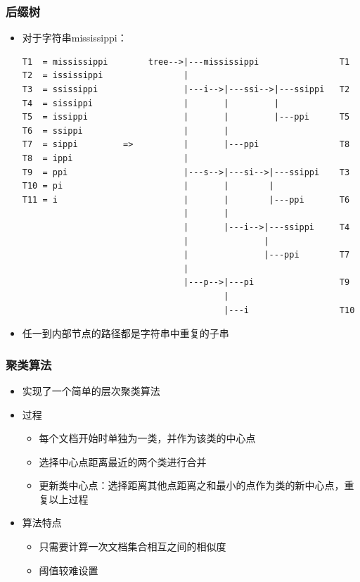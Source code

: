 \documentclass[11pt,presentation]{beamer}
\begin{document}
\begin{frame}[fragile]
\frametitle{后缀树}
\label{sec-2-9}

\begin{itemize}
\item 对于字符串mississippi：
     \tiny

\begin{verbatim}
T1  = mississippi        tree-->|---mississippi                T1
T2  = ississippi                |                             
T3  = ssissippi                 |---i-->|---ssi-->|---ssippi   T2
T4  = sissippi                  |       |         |           
T5  = issippi                   |       |         |---ppi      T5
T6  = ssippi                    |       |                     
T7  = sippi         =>          |       |---ppi                T8
T8  = ippi                      |                             
T9  = ppi                       |---s-->|---si-->|---ssippi    T3
T10 = pi                        |       |        |            
T11 = i                         |       |        |---ppi       T6
                                |       |                     
                                |       |---i-->|---ssippi     T4
                                |               |             
                                |               |---ppi        T7
                                |                             
                                |---p-->|---pi                 T9
                                        |                     
                                        |---i                  T10
\end{verbatim}
     \normalsize
\item 任一到内部节点的路径都是字符串中重复的子串
\end{itemize}
\end{frame}
\begin{frame}
\frametitle{聚类算法}
\label{sec-2-10}
\begin{itemize}

\item 实现了一个简单的层次聚类算法
\label{sec-2-10-1}%

\item 过程
\label{sec-2-10-2}%
\begin{itemize}
\item 每个文档开始时单独为一类，并作为该类的中心点
\item 选择中心点距离最近的两个类进行合并
\item 更新类中心点：选择距离其他点距离之和最小的点作为类的新中心点，重复以上过程
\end{itemize}

\item 算法特点
\label{sec-2-10-3}%
\begin{itemize}
\item 只需要计算一次文档集合相互之间的相似度
\item 阈值较难设置
\end{itemize}
\end{itemize} %
\end{frame}
\end{document}
